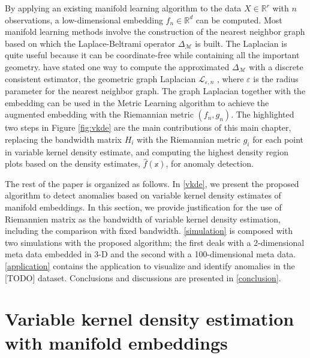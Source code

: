 \documentclass[11pt,a4paper,]{article}
\begin{document}
By applying an existing manifold learning algorithm to the data \(X\in \mathbb{R}^r\) with \(n\) observations, a low-dimensional embedding \(f_n \in \mathbb{R}^d\) can be computed. Most manifold learning methods involve the construction of the nearest neighbor graph based on which the Laplace-Beltrami operator \(\Delta_\mathcal{M}\) is built. The Laplacian is quite useful because it can be coordinate-free while containing all the important geometry. \textcite{Perrault-Joncas2013-pq} have stated one way to compute the approximated \(\Delta_\mathcal{M}\) with a discrete consistent estimator, the geometric graph Laplacian \(\mathcal{L}_{\varepsilon,n}\) \autocite{Zhou2011-za}, where \(\varepsilon\) is the radius parameter for the nearest neighbor graph. The graph Laplacian together with the embedding can be used in the Metric Learning algorithm to achieve the augmented embedding with the Riemannian metric \((f_n, g_n)\). The highlighted two steps in Figure \ref{fig:vkde} are the main contributions of this main chapter, replacing the bandwidth matrix \(H_i\) with the Riemannian metric \(g_i\) for each point in variable kernel density estimate, and computing the highest density region plots based on the density estimates, \(\hat{f}(\mathbb{x})\), for anomaly detection.

The rest of the paper is organized as follows.
In \autoref{vkde}, we present the proposed algorithm to detect anomalies based on variable kernel density estimates of manifold embeddings. In this section, we provide justification for the use of Riemannien matrix as the bandwidth of variable kernel density estimation, including the comparison with fixed bandwidth.
\autoref{simulation} is composed with two simulations with the proposed algorithm; the first deals with a 2-dimensional meta data embedded in 3-D and the second with a 100-dimensional meta data.
\autoref{application} contains the application to visualize and identify anomalies in the {[}TODO{]} dataset.
Conclusions and discussions are presented in \autoref{conclusion}.

\hypertarget{vkde}{%
\section{Variable kernel density estimation with manifold embeddings}\label{vkde}}
\end{document}
